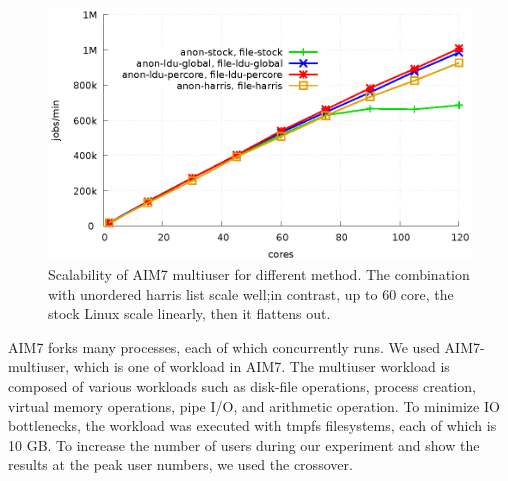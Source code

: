 \begin{figure}[tb]
  \begin{center}
    \includegraphics[scale=0.65]{graph/aim7.eps}
  \end{center}
  \caption{Scalability of AIM7 multiuser for different method.  The combination
   with unordered harris list scale well;in contrast, up to 60 core, the
  stock Linux scale linearly, then it  flattens out.}
  \label{fig:aim7}
\end{figure}

\ifkor
AIM7 forks many processes, each of which concurrently runs. 
We used AIM7-multiuser, which is one of workload in AIM7.
The multiuser workload is composed of various workloads such as disk-file
operations, process creation, virtual memory operations, pipe I/O, and
arithmetic operation.
To minimize IO bottlenecks, the workload was executed with tmpfs filesystems, each
of which is 10 GB.
To increase the number of users during our experiment and show the results at the
peak user numbers, 
we used the crossover.
\else
\fi

